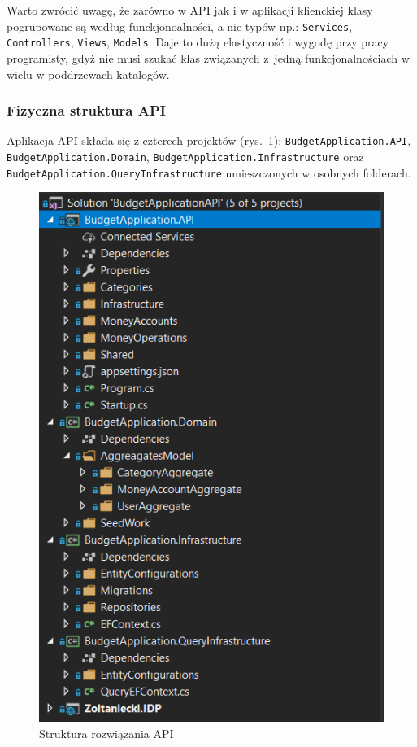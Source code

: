Warto zwrócić uwagę, że zarówno w API jak i w aplikacji klienckiej klasy pogrupowane są według funckjonoalności, a nie typów np.: \texttt{Services}, \texttt{Controllers}, \texttt{Views}, \texttt{Models}. Daje to dużą elastyczność i wygodę przy pracy programisty, gdyż nie musi szukać klas związanych z~jedną funkcjonalnościach w wielu w poddrzewach katalogów.

\subsubsection{Fizyczna struktura API}
Aplikacja API składa się z czterech projektów (rys.~\ref{fig:fiz-api-2}): \texttt{BudgetApplication.API}, \texttt{BudgetApplication.Domain}, \texttt{BudgetApplication.Infrastructure} oraz \texttt{BudgetApplication.QueryInfrastructure} umieszczonych w osobnych folderach. %
\begin{figure}[ht]
	\centering
	\includegraphics[scale=.77]{rys04/struktura-fizyczna-api-2.PNG}
	\caption{Struktura rozwiązania API}
	\label{fig:fiz-api-2}
\end{figure}

